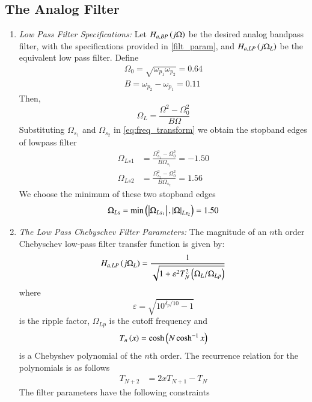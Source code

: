 \documentclass[journal,12pt,twocolumn]{IEEEtran}
\theoremstyle{remark}
\begin{document}
    \subsection{The Analog Filter}
\begin{enumerate}

\item\textit{Low Pass Filter Specifications:}  Let $H_{a, BP}\left(j\Omega\right)$ be the desired analog bandpass filter,  with the specifications provided in \ref{filt_param}, and $H_{a, LP}\left(j\Omega_L\right)$ be the equivalent low pass filter. Define 
\begin{align}
    \Omega_0 = \sqrt{\omega_{p_1}\omega_{p_2}} = 0.64 \\
    B = \omega_{p_2} - \omega_{p_1} = 0.11
\end{align}
Then, 
\begin{equation}
\Omega_L = \frac{\Omega^2 - \Omega_0^2}{B\Omega} \label{eq:freq_transform}
\end{equation}
Substituting $\Omega_{s_1}$ and $\Omega_{s_2}$ in \eqref{eq:freq_transform} we obtain the stopband edges of lowpass filter 
\begin{align}
    \Omega_{Ls1} &= \frac{\Omega_{s_1}^2 - \Omega_0^2}{B\Omega_{s_1}} = -1.50\\
    \Omega_{Ls2} &= \frac{\Omega_{s_2}^2 - \Omega_0^2}{B\Omega_{s_2}} = 1.56
\end{align}
We choose the minimum of these two stopband edges
\begin{align}
    \Omega_{Ls} = \mbox{min}\left(\left\vert\Omega_{Ls_1}\right\vert,\left\vert\Omega\right\vert_{Ls_2}\right) = 1.50
\end{align}
\item \textit{The Low Pass Chebyschev Filter Parameters:} The magnitude of an $n$th order Chebyschev low-pass filter transfer function  is given by: 
\begin{align}
     H_{a,LP}\left(j\Omega_L\right) = \dfrac{1}{\sqrt{1 + \varepsilon^2T_N^2\left(\Omega_L/\Omega_{Lp}\right)}} \label{eq:mag_freq_response}
\end{align}
where $$\varepsilon = \sqrt{10^{\delta_p/10}-1}$$ is the ripple factor, $\Omega_{Lp}$ is the cutoff frequency and $$T_n \left(x\right)= \cosh{\ensuremath{\left(N \cosh ^{-1} x\right)}}$$ is a Chebyshev polynomial of the $n$th order. 
The recurrence relation for the polynomials is as follows
\begin{align}
    T_{N+2} &= 2xT_{N+1} - T_{N}  \label{eq:cheby_poly_relation}
\end{align}
The filter parameters have the following constraints

\end{enumerate}
\end{document}
